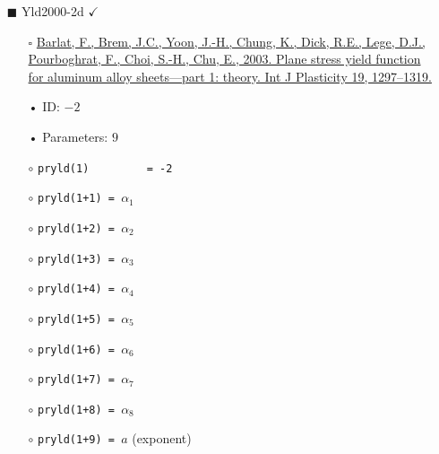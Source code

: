 \documentclass[11pt,a4paper,twoside,final,onecolumn,titlepage]{article}
\newcommand{\verified}{\hspace{0.5pt} {\LARGE $\checkmark$}}
\begin{document}
\begin{itemize}
	\item[\tiny$\blacksquare$] Yld2000-2d \verified{}
	\begin{itemize}
		\item[\tiny$\square$] {\small \href{https://doi.org/10.1016/s0749-6419(02)00019-0}{Barlat, F., Brem, J.C., Yoon, J.-H., Chung, K., Dick, R.E., Lege, D.J., Pourboghrat, F., Choi, S.-H., Chu, E., 2003. Plane stress yield function for aluminum alloy sheets—part 1: theory. Int J Plasticity 19, 1297–1319.}}\\
		\item[•] ID: $-2$
		\item[•] Parameters: $9$\\
		\item[$\circ$] \texttt{pryld(1)\,\,\,\,\,\,\,\,\,= -2}
		\item[$\circ$] \texttt{pryld(1+1) = $\alpha_1$}
		\item[$\circ$] \texttt{pryld(1+2) = $\alpha_2$}
		\item[$\circ$] \texttt{pryld(1+3) = $\alpha_3$}
		\item[$\circ$] \texttt{pryld(1+4) = $\alpha_4$}
		\item[$\circ$] \texttt{pryld(1+5) = $\alpha_5$}
		\item[$\circ$] \texttt{pryld(1+6) = $\alpha_6$}
		\item[$\circ$] \texttt{pryld(1+7) = $\alpha_7$}
		\item[$\circ$] \texttt{pryld(1+8) = $\alpha_8$}
		\item[$\circ$] \texttt{pryld(1+9) = $a$} (exponent)\\
	\end{itemize}
\end{itemize}
\end{document}
